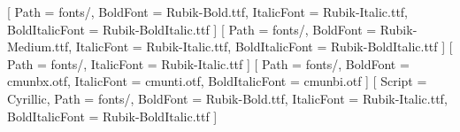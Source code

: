\usepackage[a4paper,margin=0pt]{geometry}
\usepackage{fontspec}
\usepackage{polyglossia}
\usepackage[dvipsnames]{xcolor}
\usepackage{tikz}
\usepackage{eso-pic}
\usepackage{enumitem}
\usepackage{tabularx}
\usepackage{array}
\usepackage{calc}
\usepackage{graphicx}
\usepackage{textcomp}
\usepackage[hidelinks]{hyperref}
\usepackage[final]{microtype}
\usepackage{ragged2e}

\setmainfont{Rubik-Regular.ttf}[
  Path = fonts/,
  BoldFont = Rubik-Bold.ttf,
  ItalicFont = Rubik-Italic.ttf,
  BoldItalicFont = Rubik-BoldItalic.ttf
]
\newfontfamily{}[
  Path = fonts/,
  BoldFont = Rubik-Medium.ttf,
  ItalicFont = Rubik-Italic.ttf,
  BoldItalicFont = Rubik-BoldItalic.ttf
]
\newfontfamily{}[
  Path = fonts/,
  ItalicFont = Rubik-Italic.ttf
]
\newfontfamily{}[
  Path = fonts/,
  BoldFont = cmunbx.otf,
  ItalicFont = cmunti.otf,
  BoldItalicFont = cmunbi.otf
]
\newfontfamily{}[
  Script = Cyrillic,
  Path = fonts/,
  BoldFont = Rubik-Bold.ttf,
  ItalicFont = Rubik-Italic.ttf,
  BoldItalicFont = Rubik-BoldItalic.ttf
]

\pagestyle{empty}
\setlength{\parindent}{0pt}
\setlength{\parskip}{0pt}
\setlength{\tabcolsep}{0pt}
\setlength{\fboxsep}{0pt}
\setlength{\emergencystretch}{2em}
\raggedbottom
{}
\hypersetup{colorlinks=true, urlcolor=black, linkcolor=black}


\newlength{\sidebarwidth}
\setlength{\sidebarwidth}{0.355\paperwidth}
\newlength{\mainwidth}
\setlength{\mainwidth}{\paperwidth-\sidebarwidth}
\newlength{\sidebarinnerwidth}
\setlength{\sidebarinnerwidth}{\sidebarwidth-2.12cm}
\newlength{\maininnerwidth}
\setlength{\maininnerwidth}{\mainwidth-1.72cm}
\newlength{\pagecontentheight}
\setlength{\pagecontentheight}{\paperheight-1.05cm}
\newlength{\sidebarinnerheight}
\setlength{\sidebarinnerheight}{\pagecontentheight-0.84cm}
\newlength{\maininnerheight}
\setlength{\maininnerheight}{\pagecontentheight-0.74cm}
\newlength{\maindatewidth}
\setlength{\maindatewidth}{2.65cm}
\newlength{\maingap}
\setlength{\maingap}{0.30cm}

\newlength{\avatarheight}
\setlength{\avatarheight}{5.33cm}

